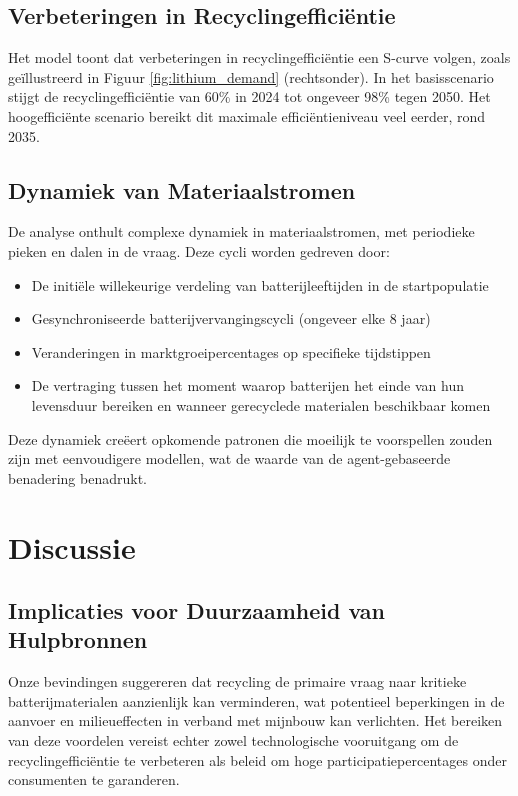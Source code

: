 \documentclass[10pt,a4paper,twocolumn]{article}
\begin{document}
\subsection{Verbeteringen in Recyclingefficiëntie}

Het model toont dat verbeteringen in recyclingefficiëntie een S-curve volgen, zoals geïllustreerd in Figuur \ref{fig:lithium_demand} (rechtsonder). In het basisscenario stijgt de recyclingefficiëntie van 60\% in 2024 tot ongeveer 98\% tegen 2050. Het hoogefficiënte scenario bereikt dit maximale efficiëntieniveau veel eerder, rond 2035.

\subsection{Dynamiek van Materiaalstromen}

De analyse onthult complexe dynamiek in materiaalstromen, met periodieke pieken en dalen in de vraag. Deze cycli worden gedreven door:

\begin{itemize}
    \item De initiële willekeurige verdeling van batterijleeftijden in de startpopulatie
    \item Gesynchroniseerde batterijvervangingscycli (ongeveer elke 8 jaar)
    \item Veranderingen in marktgroeipercentages op specifieke tijdstippen
    \item De vertraging tussen het moment waarop batterijen het einde van hun levensduur bereiken en wanneer gerecyclede materialen beschikbaar komen
\end{itemize}

Deze dynamiek creëert opkomende patronen die moeilijk te voorspellen zouden zijn met eenvoudigere modellen, wat de waarde van de agent-gebaseerde benadering benadrukt.

\section{Discussie}
\label{sec:discussion}

\subsection{Implicaties voor Duurzaamheid van Hulpbronnen}

Onze bevindingen suggereren dat recycling de primaire vraag naar kritieke batterijmaterialen aanzienlijk kan verminderen, wat potentieel beperkingen in de aanvoer en milieueffecten in verband met mijnbouw kan verlichten. Het bereiken van deze voordelen vereist echter zowel technologische vooruitgang om de recyclingefficiëntie te verbeteren als beleid om hoge participatiepercentages onder consumenten te garanderen.
\end{document}
